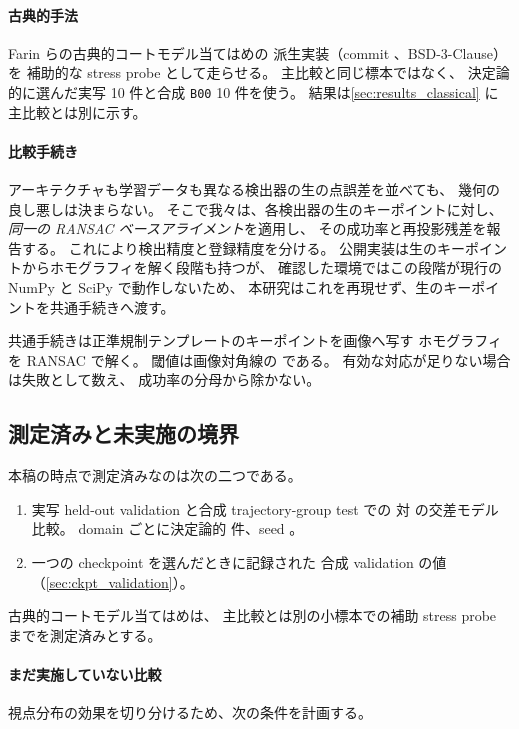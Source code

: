 \paragraph{古典的手法}
Farin らの古典的コートモデル当てはめ\cite{farin2004courtmodels}の
派生実装\cite{gchlebusrepo}（commit \ClassicBaselineCommit、BSD-3-Clause）を
補助的な stress probe として走らせる。
主比較と同じ標本ではなく、
決定論的に選んだ実写 10 件と合成 \texttt{B00} 10 件を使う。
結果は\cref{sec:results_classical} に主比較とは別に示す。

\paragraph{比較手続き}
アーキテクチャも学習データも異なる検出器の生の点誤差を並べても、
幾何の良し悪しは決まらない。
そこで我々は、各検出器の生のキーポイントに対し、
\emph{同一の RANSAC ベースアライメント}を適用し、
その成功率と再投影残差を報告する。
これにより検出精度と登録精度を分ける。
公開実装は生のキーポイントからホモグラフィを解く段階も持つが、
確認した環境ではこの段階が現行の NumPy と SciPy で動作しないため、
本研究はこれを再現せず、生のキーポイントを共通手続きへ渡す。

共通手続きは正準規制テンプレートのキーポイントを画像へ写す
ホモグラフィを RANSAC で解く。
閾値は画像対角線の \resBenchRansacThreshold である。
有効な対応が足りない場合は失敗として数え、
成功率の分母から除かない。

\subsection{測定済みと未実施の境界}
\label{sec:measurement_boundary}

本稿の時点で測定済みなのは次の二つである。

\begin{enumerate}[leftmargin=1.6em]
  \item 実写 held-out validation と合成 trajectory-group test での
  \Method 対 \BaselineShort の交差モデル比較。
  domain ごとに決定論的 \resBenchDomainSamples 件、seed \resBenchSeed。
  \item 一つの checkpoint を選んだときに記録された
  合成 validation の値（\cref{sec:ckpt_validation}）。
\end{enumerate}

古典的コートモデル当てはめは、
主比較とは別の小標本での補助 stress probe までを測定済みとする。

\paragraph{まだ実施していない比較}
視点分布の効果を切り分けるため、次の条件を計画する。


